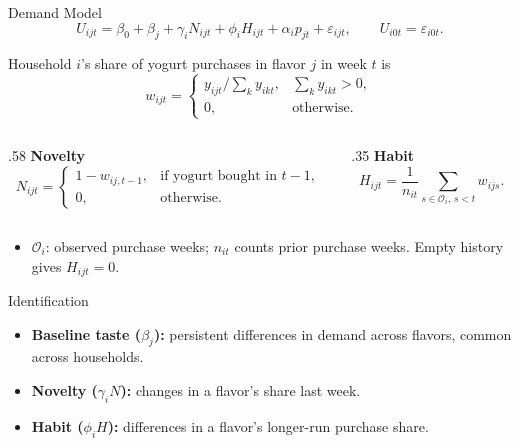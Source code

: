 \documentclass[aspectratio=169,professionalfonts]{beamer}
\newcommand{\shortbuttons}{}
\begin{document}
\begin{frame}[label=short-27]{Demand Model}
  \footnotesize
  \[
    U_{ijt}=
    \beta_0+\beta_j+
    \gamma_iN_{ijt}+
    \phi_iH_{ijt}
    +\alpha_i p_{jt}+\varepsilon_{ijt},
    \qquad U_{i0t}=\varepsilon_{i0t}.
  \]

  Household $i$'s share of yogurt purchases in flavor $j$ in week $t$ is
  \[
    w_{ijt}=\begin{cases}y_{ijt}/\sum_k y_{ikt},&\sum_k y_{ikt}>0,\\0,&\text{otherwise}.\end{cases}
  \]

  \begin{columns}[T,onlytextwidth]
    \begin{column}{.58\textwidth}
      \textbf{Novelty}
      \[
        N_{ijt}=\begin{cases}
          1-w_{ij,t-1}, & \text{if yogurt bought in $t-1$},\\
          0, & \text{otherwise}.
        \end{cases}
      \]
    \end{column}
    \begin{column}{.35\textwidth}
      \textbf{Habit}
      \[
        H_{ijt}=\frac{1}{n_{it}}\sum_{s\in\mathcal O_i,\,s<t}w_{ijs}.
      \]
    \end{column}
  \end{columns}
  \begin{itemize}
    \item $\mathcal O_i$: observed purchase weeks; $n_{it}$ counts prior purchase weeks. Empty history gives $H_{ijt}=0$.
  \end{itemize}
\end{frame}



\gdef\shortbuttons{}
\begin{frame}[label=short-identification]{Identification}
  \small
  \begin{itemize}
    \item \textbf{Baseline taste ($\beta_j$):} persistent differences in demand across flavors, common across households.
    \item \textbf{Novelty ($\gamma_iN$):} changes in a flavor's share last week.
    \item \textbf{Habit ($\phi_iH$):} differences in a flavor's longer-run purchase share.
  \end{itemize}
\end{frame}
\end{document}
